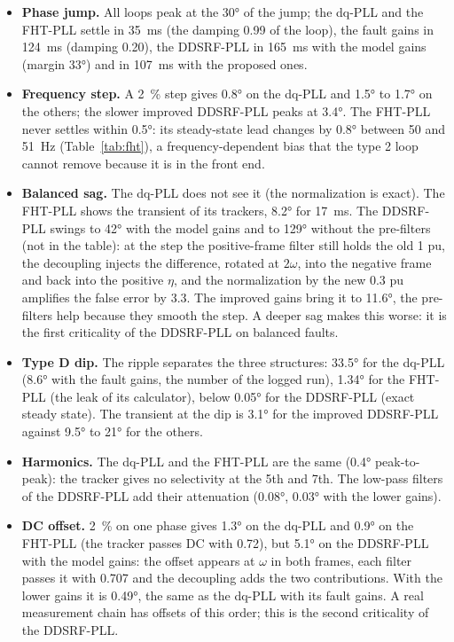 \documentclass[11pt,a4paper]{scrartcl}
\begin{document}
\begin{onehalfspace}
\begin{itemize}
	\item \textbf{Phase jump.} All loops peak at the \ang{30} of the jump; the dq-PLL and the FHT-PLL settle in \SI{35}{\milli\second} (the damping \num{0.99} of the loop), the fault gains in \SI{124}{\milli\second} (damping \num{0.20}), the DDSRF-PLL in \SI{165}{\milli\second} with the model gains (margin \ang{33}) and in \SI{107}{\milli\second} with the proposed ones.
	\item \textbf{Frequency step.} A \num{2}~\% step gives \ang{0.8} on the dq-PLL and \ang{1.5} to \ang{1.7} on the others; the slower improved DDSRF-PLL peaks at \ang{3.4}. The FHT-PLL never settles within \ang{0.5}: its steady-state lead changes by \ang{0.8} between \SI{50}{} and \SI{51}{\hertz} (Table~\ref{tab:fht}), a frequency-dependent bias that the type 2 loop cannot remove because it is in the front end.
	\item \textbf{Balanced sag.} The dq-PLL does not see it (the normalization is exact). The FHT-PLL shows the transient of its trackers, \ang{8.2} for \SI{17}{\milli\second}. The DDSRF-PLL swings to \ang{42} with the model gains and to \ang{129} without the pre-filters (not in the table): at the step the positive-frame filter still holds the old \num{1} pu, the decoupling injects the difference, rotated at $2\omega$, into the negative frame and back into the positive $\eta$, and the normalization by the new \num{0.3} pu amplifies the false error by \num{3.3}. The improved gains bring it to \ang{11.6}, the pre-filters help because they smooth the step. A deeper sag makes this worse: it is the first criticality of the DDSRF-PLL on balanced faults.
	\item \textbf{Type D dip.} The ripple separates the three structures: \ang{33.5} for the dq-PLL (\ang{8.6} with the fault gains, the number of the logged run), \ang{1.34} for the FHT-PLL (the leak of its calculator), below \ang{0.05} for the DDSRF-PLL (exact steady state). The transient at the dip is \ang{3.1} for the improved DDSRF-PLL against \ang{9.5} to \ang{21} for the others.
	\item \textbf{Harmonics.} The dq-PLL and the FHT-PLL are the same (\ang{0.4} peak-to-peak): the tracker gives no selectivity at the 5th and 7th. The low-pass filters of the DDSRF-PLL add their attenuation (\ang{0.08}, \ang{0.03} with the lower gains).
	\item \textbf{DC offset.} \num{2}~\% on one phase gives \ang{1.3} on the dq-PLL and \ang{0.9} on the FHT-PLL (the tracker passes DC with \num{0.72}), but \ang{5.1} on the DDSRF-PLL with the model gains: the offset appears at $\omega$ in both frames, each filter passes it with \num{0.707} and the decoupling adds the two contributions. With the lower gains it is \ang{0.49}, the same as the dq-PLL with its fault gains. A real measurement chain has offsets of this order; this is the second criticality of the DDSRF-PLL.
\end{itemize}


\end{onehalfspace}
\end{document}
